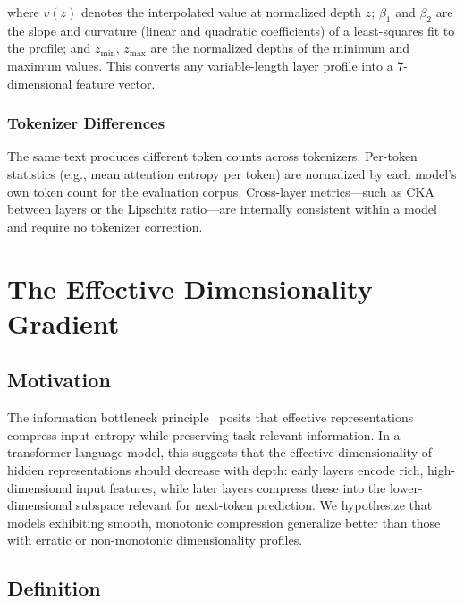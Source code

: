 \documentclass[preprint]{neurips_2025}
\begin{document}
\noindent where $v(z)$ denotes the interpolated value at normalized depth $z$; $\beta_1$ and $\beta_2$ are the slope and curvature (linear and quadratic coefficients) of a least-squares fit to the profile; and $z_{\min}$, $z_{\max}$ are the normalized depths of the minimum and maximum values.
This converts any variable-length layer profile into a 7-dimensional feature vector.

\subsubsection{Tokenizer Differences}
\label{sec:norm-tok}

The same text produces different token counts across tokenizers.
Per-token statistics (e.g., mean attention entropy per token) are normalized by each model's own token count for the evaluation corpus.
Cross-layer metrics---such as CKA between layers or the Lipschitz ratio---are internally consistent within a model and require no tokenizer correction.

\section{The Effective Dimensionality Gradient}
\label{sec:edg}

\subsection{Motivation}
\label{sec:edg-motivation}

The information bottleneck principle~\citep{tishby2015deep,shwartz2017opening} posits that effective representations compress input entropy while preserving task-relevant information.
In a transformer language model, this suggests that the effective dimensionality of hidden representations should decrease with depth: early layers encode rich, high-dimensional input features, while later layers compress these into the lower-dimensional subspace relevant for next-token prediction.
We hypothesize that models exhibiting smooth, monotonic compression generalize better than those with erratic or non-monotonic dimensionality profiles.

\subsection{Definition}
\label{sec:edg-definition}
\end{document}
